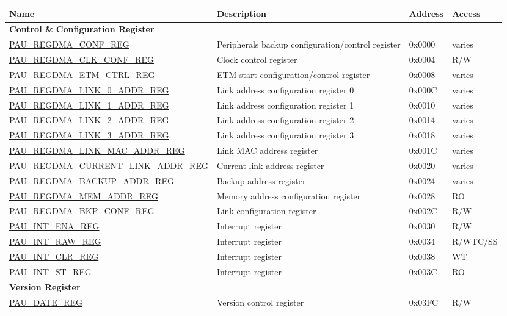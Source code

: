 \begin{longtable}{ | l | p{6cm} | p{1.3cm} | p{1.5cm} | }
\hline\rowcolor{lightgray}
\textbf{Name} & \textbf{Description} &  \textbf{Address} & \textbf{Access} \\ \hline
\endhead
\multicolumn{4}{|l|}{\textbf{Control \& Configuration Register}} \\ \hline
\hyperref[regdesc:PAUREGDMACONFREG]{PAU\_REGDMA\_CONF\_REG} & Peripherals backup configuration/control register & 0x0000 & varies \\ \hline
\hyperref[regdesc:PAUREGDMACLKCONFREG]{PAU\_REGDMA\_CLK\_CONF\_REG} & Clock control register & 0x0004 & R/W \\ \hline
\hyperref[regdesc:PAUREGDMAETMCTRLREG]{PAU\_REGDMA\_ETM\_CTRL\_REG} & ETM start configuration/control register & 0x0008 & varies \\ \hline
\hyperref[regdesc:PAUREGDMALINK0ADDRREG]{PAU\_REGDMA\_LINK\_0\_ADDR\_REG} & Link address configuration register 0 & 0x000C & varies \\ \hline
\hyperref[regdesc:PAUREGDMALINK1ADDRREG]{PAU\_REGDMA\_LINK\_1\_ADDR\_REG} & Link address configuration register 1 & 0x0010 & varies \\ \hline
\hyperref[regdesc:PAUREGDMALINK2ADDRREG]{PAU\_REGDMA\_LINK\_2\_ADDR\_REG} & Link address configuration register 2 & 0x0014 & varies \\ \hline
\hyperref[regdesc:PAUREGDMALINK3ADDRREG]{PAU\_REGDMA\_LINK\_3\_ADDR\_REG} & Link address configuration register 3 & 0x0018 & varies \\ \hline
\hyperref[regdesc:PAUREGDMALINKMACADDRREG]{PAU\_REGDMA\_LINK\_MAC\_ADDR\_REG} & Link MAC address register & 0x001C & varies \\ \hline
\hyperref[regdesc:PAUREGDMACURRENTLINKADDRREG]{PAU\_REGDMA\_CURRENT\_LINK\_ADDR\_REG} & Current link address register & 0x0020 & varies \\ \hline
\hyperref[regdesc:PAUREGDMABACKUPADDRREG]{PAU\_REGDMA\_BACKUP\_ADDR\_REG} & Backup address register & 0x0024 & varies \\ \hline
\hyperref[regdesc:PAUREGDMAMEMADDRREG]{PAU\_REGDMA\_MEM\_ADDR\_REG} & Memory address configuration register & 0x0028 & RO \\ \hline
\hyperref[regdesc:PAUREGDMABKPCONFREG]{PAU\_REGDMA\_BKP\_CONF\_REG} & Link configuration register & 0x002C & R/W \\ \hline
\hyperref[regdesc:PAUINTENAREG]{PAU\_INT\_ENA\_REG} & Interrupt register & 0x0030 & R/W \\ \hline
\hyperref[regdesc:PAUINTRAWREG]{PAU\_INT\_RAW\_REG} & Interrupt register & 0x0034 & R/WTC/SS \\ \hline
\hyperref[regdesc:PAUINTCLRREG]{PAU\_INT\_CLR\_REG} & Interrupt register & 0x0038 & WT \\ \hline
\hyperref[regdesc:PAUINTSTREG]{PAU\_INT\_ST\_REG} & Interrupt register & 0x003C & RO \\ \hline
\multicolumn{4}{|l|}{\textbf{Version Register}} \\ \hline
\hyperref[regdesc:PAUDATEREG]{PAU\_DATE\_REG} & Version control register & 0x03FC & R/W \\ \hline
\end{longtable}

